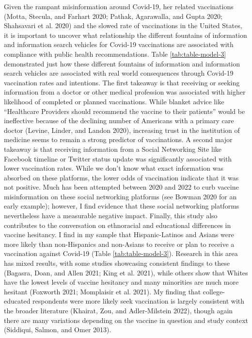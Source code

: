 Given the rampant misinformation around Covid-19, her related vaccinations
(Motta, Stecula, and Farhart 2020; Pathak, Agarawalla, and Gupta 2020; Shahsavari et al. 2020) and the slowed rate of vaccinations in the
United States, it is important to uncover what relationship the different
fountains of information and information search vehicles for Covid-19 vaccinations
are associated with compliance with public health recommendations. Table
\ref{tab:table-model-3} demonstrated just how these different fountains of
information and information search vehicles are associated with real world
consequences through Covid-19 vaccination rates and intentions. The first
takeaway is that receiving or seeking information from a doctor or other medical
profession was associated with higher likelihood of completed or planned vaccinations.
While blanket advice like ``Healthcare Providers should recommend the vaccine to
their patients'' would be ineffective because of the declining number of
Americans with a primary care doctor (Levine, Linder, and Landon 2020), increasing trust in the
institution of medicine seems to remain a strong predictor of vaccinations.
A second major takeaway is that receiving information from a Social Networking
Site like Facebook timeline or Twitter status update was significantly
associated with lower vaccination rates. While we don't know what exact
information was absorbed on these platforms, the lower odds of vaccination
indicate that it was not positive. Much has been attempted between 2020 and 2022
to curb vaccine misinformation on these social networking platforms (see Bowman 2020 for an early example); however, I find evidence that these social
networking platforms nevertheless have a measurable negative impact. Finally,
this study also contributes to the conversation on ethnoracial and
educational differences in vaccine hesitancy. I find in my sample that
Hispanic-Latinos and Asians were more likely than non-Hispanics and non-Asians
to receive or plan to receive a vaccination against Covid-19 (Table
\ref{tab:table-model-3}). Research in this area has mixed results, with some
studies showcasing consistent findings to these (Bagasra, Doan, and Allen 2021; King et al. 2021),
while others show that Whites have the lowest levels of vaccine hesitancy and
many minorities are much more hesitant (Foxworth 2021; Momplaisir et al. 2021). My finding that college-educated respondents were more likely seek
vaccination is largely consistent with the broader literature
(Khairat, Zou, and Adler-Milstein 2022), though again there are many variations depending on the vaccine
in question and study context (Siddiqui, Salmon, and Omer 2013).

